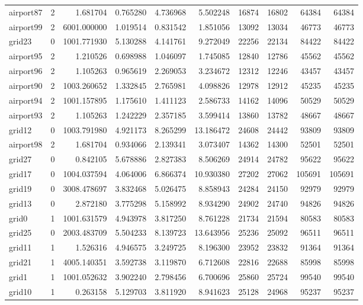 \begin{longtable}{|l|r|r|r|r|r|r|r|r|r|}
airport87 & 2 & 1.681704 & 0.765280 & 4.736968 & 5.502248 & 16874 & 16802 & 64384 & 64384 \\
airport99 & 2 & 6001.000000 & 1.019514 & 0.831542 & 1.851056 & 13092 & 13034 & 46773 & 46773 \\
grid23 & 0 & 1001.771930 & 5.130288 & 4.141761 & 9.272049 & 22256 & 22134 & 84422 & 84422 \\
airport95 & 2 & 1.210526 & 0.698988 & 1.046097 & 1.745085 & 12840 & 12786 & 45562 & 45562 \\
airport96 & 2 & 1.105263 & 0.965619 & 2.269053 & 3.234672 & 12312 & 12246 & 43457 & 43457 \\
airport90 & 2 & 1003.260652 & 1.332845 & 2.765981 & 4.098826 & 12978 & 12912 & 45235 & 45235 \\
airport94 & 2 & 1001.157895 & 1.175610 & 1.411123 & 2.586733 & 14162 & 14096 & 50529 & 50529 \\
airport93 & 2 & 1.105263 & 1.242229 & 2.357185 & 3.599414 & 13860 & 13782 & 48667 & 48667 \\
grid12 & 0 & 1003.791980 & 4.921173 & 8.265299 & 13.186472 & 24608 & 24442 & 93809 & 93809 \\
airport98 & 2 & 1.681704 & 0.934066 & 2.139341 & 3.073407 & 14362 & 14300 & 52501 & 52501 \\
grid27 & 0 & 0.842105 & 5.678886 & 2.827383 & 8.506269 & 24914 & 24782 & 95622 & 95622 \\
grid17 & 0 & 1004.037594 & 4.064006 & 6.866374 & 10.930380 & 27202 & 27062 & 105691 & 105691 \\
grid19 & 0 & 3008.478697 & 3.832468 & 5.026475 & 8.858943 & 24284 & 24150 & 92979 & 92979 \\
grid13 & 0 & 2.872180 & 3.775298 & 5.158992 & 8.934290 & 24902 & 24740 & 94826 & 94826 \\
grid0 & 1 & 1001.631579 & 4.943978 & 3.817250 & 8.761228 & 21734 & 21594 & 80583 & 80583 \\
grid25 & 0 & 2003.483709 & 5.504233 & 8.139723 & 13.643956 & 25236 & 25092 & 96511 & 96511 \\
grid11 & 1 & 1.526316 & 4.946575 & 3.249725 & 8.196300 & 23952 & 23832 & 91364 & 91364 \\
grid21 & 1 & 4005.140351 & 3.592738 & 3.119870 & 6.712608 & 22816 & 22688 & 85998 & 85998 \\
grid1 & 1 & 1001.052632 & 3.902240 & 2.798456 & 6.700696 & 25860 & 25724 & 99540 & 99540 \\
grid10 & 1 & 0.263158 & 5.129703 & 3.811920 & 8.941623 & 25128 & 24968 & 95237 & 95237 \\

\end{longtable}
